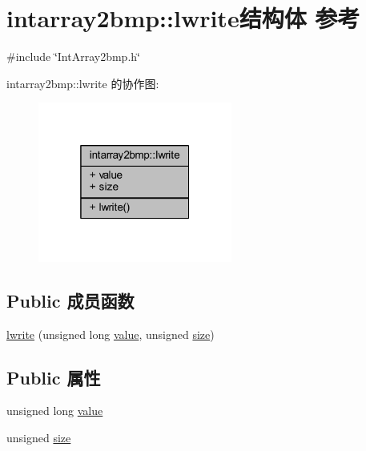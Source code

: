 \hypertarget{structintarray2bmp_1_1lwrite}{}\section{intarray2bmp\+:\+:lwrite结构体 参考}
\label{structintarray2bmp_1_1lwrite}


{\ttfamily \#include \char`\"{}Int\+Array2bmp.\+h\char`\"{}}



intarray2bmp\+:\+:lwrite 的协作图\+:
\nopagebreak
\begin{figure}[H]
\begin{center}
\leavevmode
\includegraphics[width=181pt]{structintarray2bmp_1_1lwrite__coll__graph}
\end{center}
\end{figure}
\subsection*{Public 成员函数}
\begin{DoxyCompactItemize}
\item 
\hyperlink{structintarray2bmp_1_1lwrite_aab51acb091b0986ff1b2fd3626f5f88f}{lwrite} (unsigned long \hyperlink{structintarray2bmp_1_1lwrite_a054185f53b9977e24f9e54bc611f7e9e}{value}, unsigned \hyperlink{structintarray2bmp_1_1lwrite_af9a3a6332e486dec31a6a3264ed00a98}{size})
\end{DoxyCompactItemize}
\subsection*{Public 属性}
\begin{DoxyCompactItemize}
\item 
unsigned long \hyperlink{structintarray2bmp_1_1lwrite_a054185f53b9977e24f9e54bc611f7e9e}{value}
\item 
unsigned \hyperlink{structintarray2bmp_1_1lwrite_af9a3a6332e486dec31a6a3264ed00a98}{size}
\end{DoxyCompactItemize}


